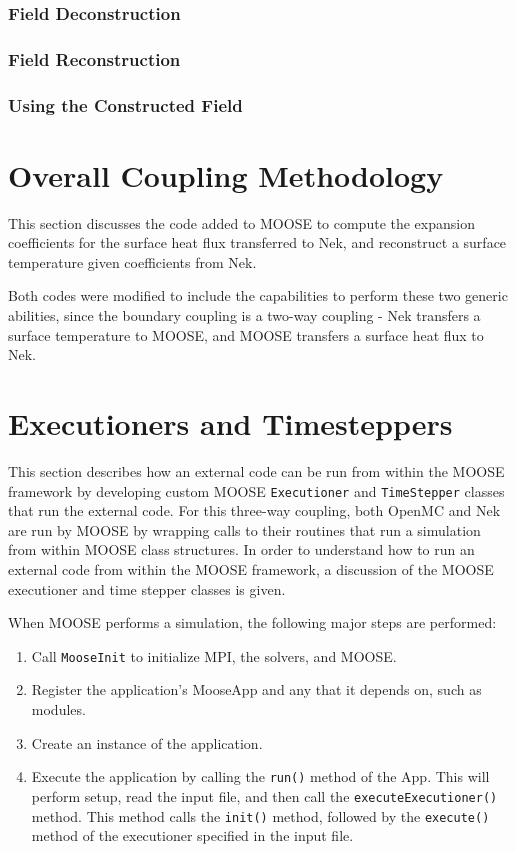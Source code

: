 \documentclass[10pt]{article}
\numberwithin{equation}{section} %
\begin{document}
\subsubsection{Field Deconstruction}
\subsubsection{Field Reconstruction}
\subsubsection{Using the Constructed Field}

\section{Overall Coupling Methodology}
This section discusses the code added to MOOSE to compute the expansion coefficients for the surface heat flux transferred to Nek, and reconstruct a surface temperature given coefficients from Nek.

Both codes were modified to include the capabilities to perform these two generic abilities, since the boundary coupling is a two-way coupling - Nek transfers a surface temperature to MOOSE, and MOOSE transfers a surface heat flux to Nek. 

\section{Executioners and Timesteppers}
This section describes how an external code can be run from within the MOOSE framework by developing custom MOOSE {\tt Executioner} and {\tt TimeStepper} classes that run the external code. For this three-way coupling, both OpenMC and Nek are run by MOOSE by wrapping calls to their routines that run a simulation from within MOOSE class structures. In order to understand how to run an external code from within the MOOSE framework, a discussion of the MOOSE executioner and time stepper classes is given. 

When MOOSE performs a simulation, the following major steps are performed:

\begin{enumerate}
\item Call {\tt MooseInit} to initialize MPI, the solvers, and MOOSE.
\item Register the application's MooseApp and any that it depends on, such as modules. 
\item Create an instance of the application.
\item Execute the application by calling the {\tt run()} method of the App. This will perform setup, read the input file, and then call the {\tt executeExecutioner()} method. This method calls the {\tt init()} method, followed by the {\tt execute()} method of the executioner specified in the input file.
\end{enumerate}
\end{document}

